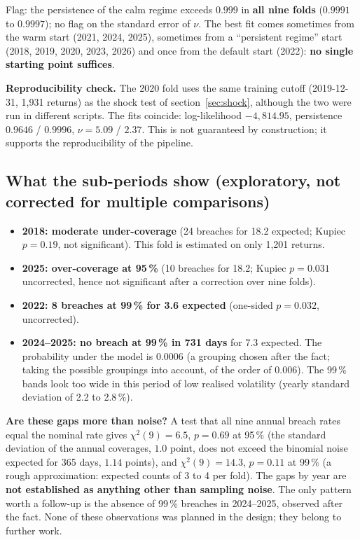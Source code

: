 \documentclass[12pt,a4paper]{article}
\begin{document}
Flag: the persistence of the calm regime exceeds $0.999$ in \textbf{all nine folds} ($0.9991$ to $0.9997$); no flag on the standard error of $\nu$. The best fit comes sometimes from the warm start (2021, 2024, 2025), sometimes from a ``persistent regime'' start (2018, 2019, 2020, 2023, 2026) and once from the default start (2022): \textbf{no single starting point suffices}.

\textbf{Reproducibility check.} The 2020 fold uses the same training cutoff (2019-12-31, 1,931 returns) as the shock test of section~\ref{sec:shock}, although the two were run in different scripts. The fits coincide: log-likelihood $-4{,}814.95$, persistence $0.9646$ / $0.9996$, $\nu = 5.09$ / $2.37$. This is not guaranteed by construction; it supports the reproducibility of the pipeline.


\subsection{What the sub-periods show (exploratory, not corrected for multiple comparisons)}

\begin{itemize}
	\item \textbf{2018: moderate under-coverage} (24 breaches for 18.2 expected; Kupiec $p=0.19$, not significant). This fold is estimated on only 1,201 returns.
	\item \textbf{2025: over-coverage at 95\,\%} (10 breaches for 18.2; Kupiec $p=0.031$ uncorrected, hence not significant after a correction over nine folds).
	\item \textbf{2022: 8 breaches at 99\,\% for 3.6 expected} (one-sided $p=0.032$, uncorrected).
	\item \textbf{2024--2025: no breach at 99\,\% in 731 days} for 7.3 expected. The probability under the model is $0.0006$ (a grouping chosen after the fact; taking the possible groupings into account, of the order of $0.006$). The 99\,\% bands look too wide in this period of low realised volatility (yearly standard deviation of 2.2 to 2.8\,\%).
\end{itemize}

\textbf{Are these gaps more than noise?} A test that all nine annual breach rates equal the nominal rate gives $\chi^2(9)=6.5$, $p=0.69$ at 95\,\% (the standard deviation of the annual coverages, $1.0$ point, does not exceed the binomial noise expected for 365 days, $1.14$ points), and $\chi^2(9)=14.3$, $p=0.11$ at 99\,\% (a rough approximation: expected counts of 3 to 4 per fold). The gaps by year are \textbf{not established as anything other than sampling noise}. The only pattern worth a follow-up is the absence of 99\,\% breaches in 2024--2025, observed after the fact. None of these observations was planned in the design; they belong to further work.
\end{document}
